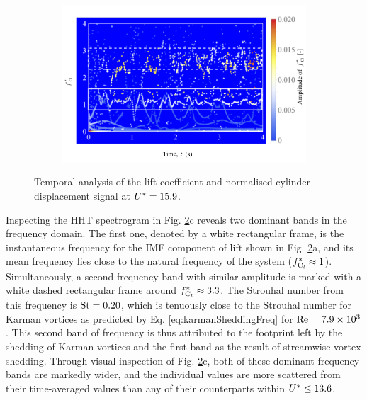 \documentclass[oneside]{utmthesis}
\begin{document}
\begin{figure} \continuedfloat
  \centering
  \begin{subfigure}[h]{1\textwidth}
    \includegraphics[width=\textwidth]{figs/tempAnalysisTransition-c}
    \caption{}
    \label{fig:tempAnalysisTransition-c}
  \end{subfigure}
  \caption{Temporal analysis of the lift coefficient and normalised cylinder displacement signal at $U^{*} = 15.9$.}
  \label{fig:tempAnalysisTransition}
\end{figure}

Inspecting the HHT spectrogram in Fig. \ref{fig:tempAnalysisTransition}c reveals two dominant bands in the frequency domain. The first one, denoted by a white rectangular frame, is the instantaneous frequency for the IMF component of lift shown in Fig. \ref{fig:tempAnalysisTransition}a, and its mean frequency lies close to the natural frequency of the system ($f_{\text{C}_{l}}^{*} \approx 1$). Simultaneously, a second frequency band with similar amplitude is marked with a white dashed rectangular frame around $f_{\text{C}_{l}}^{*} \approx 3.3$. The Strouhal number from this frequency is $\text{St} = 0.20$, which is tenuously close to the Strouhal number for Karman vortices as predicted by Eq. \ref{eq:karmanSheddingFreq} for $\text{Re} = 7.9 \times 10^{3}$. This second band of frequency is thus attributed to the footprint left by the shedding of Karman vortices and the first band as the result of streamwise vortex shedding. Through visual inspection of Fig. \ref{fig:tempAnalysisTransition}c, both of these dominant frequency bands are markedly wider, and the individual values are more scattered from their time-averaged values than any of their counterparts within $U^{*} \leq 13.6$.
\end{document}
